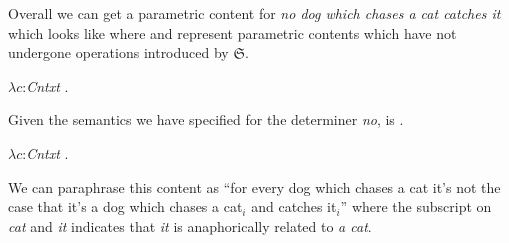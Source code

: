 Overall we can get a parametric content for \textit{no dog which
  chases a cat catches it} which looks like \nexteg{} where
 \usebox{\boxone}
and \usebox{\boxtwo} represent parametric contents
which have not undergone operations introduced by $\mathfrak{S}$.
\begin{ex} 
  $\lambda c$:\textit{Cntxt} . 
\end{ex} 
Given the semantics we have specified for the determiner \textit{no},
\preveg{} is \nexteg{}.
\begin{ex} 
  $\lambda c$:\textit{Cntxt} . 
\end{ex} 
We can paraphrase this content as ``for every dog which chases a cat
it's not the case that it's a dog which chases a cat$_i$ and catches
it$_i$'' where the subscript on \textit{cat} and \textit{it} indicates
that \textit{it} is anaphorically related to \textit{a cat}.


